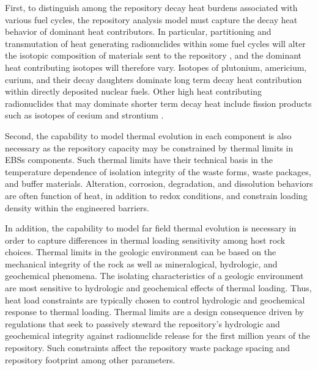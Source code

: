 First, to distinguish among the repository decay heat burdens associated with 
various fuel cycles, the repository analysis model must
capture the decay heat behavior of dominant heat contributors. In particular, 
partitioning and transmutation of heat generating radionuclides within  some 
fuel cycles will alter the isotopic composition of materials sent to the 
repository \cite{swift_applying_2010}, and the dominant heat contributing 
isotopes will therefore vary.  Isotopes of plutonium, americium, curium, and their 
decay daughters dominate long term decay heat contribution within directly 
deposited nuclear fuels. Other high heat contributing radionuclides that may 
dominate shorter term decay heat include fission products such as isotopes of 
cesium and strontium \cite{piet_which_2007}. 

Second, the capability to model thermal evolution in each component is also 
necessary as the repository capacity may be constrained by thermal limits in 
\glspl{EBS} components. Such thermal limits have their technical basis in the 
temperature dependence of isolation integrity of the waste forms, waste 
packages, and buffer materials. Alteration, corrosion, degradation, and 
dissolution behaviors are often function of heat, in addition to redox 
conditions, and constrain loading density within the engineered barriers. 

In addition, the capability to model far field thermal evolution is necessary 
in order to capture differences in thermal loading sensitivity among host rock 
choices. Thermal limits in the geologic environment can be based on the 
mechanical integrity of the rock as well as mineralogical, hydrologic, and 
geochemical phenomena. The isolating characteristics of a geologic 
environment are most sensitive to hydrologic and geochemical effects of thermal 
loading. Thus, heat load constraints are typically chosen to control hydrologic 
and geochemical response to thermal loading. Thermal limits are a design 
consequence driven by regulations that seek to passively steward the 
repository's hydrologic and geochemical integrity against radionuclide  release 
for the first million years of the repository.  Such constraints affect the 
repository waste package spacing and repository footprint among other 
parameters. 


